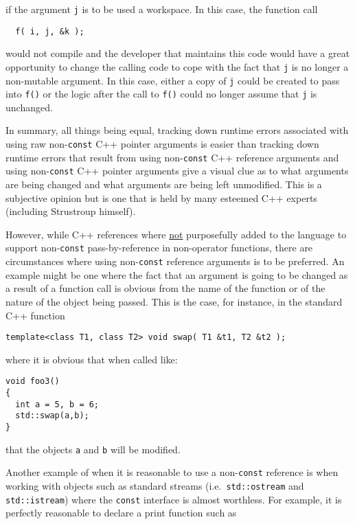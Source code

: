 {}\noindent{}if the argument {}\texttt{j} is to be used a workspace.
In this case, the function call

{\scriptsize\begin{verbatim}
  f( i, j, &k );
\end{verbatim}}

{}\noindent{}would not compile and the developer that maintains this
code would have a great opportunity to change the calling code to cope
with the fact that {}\texttt{j} is no longer a non-mutable argument.
In this case, either a copy of {}\texttt{j} could be created to pass
into {}\texttt{f()} or the logic after the call to {}\texttt{f()}
could no longer assume that {}\texttt{j} is unchanged.

In summary, all things being equal, tracking down runtime errors
associated with using raw non-\texttt{const} C++ pointer arguments is
easier than tracking down runtime errors that result from using
non-\texttt{const} C++ reference arguments and using
non-\texttt{const} C++ pointer arguments give a visual clue as to what
arguments are being changed and what arguments are being left
unmodified.  This is a subjective opinion but is one that is held by
many esteemed C++ experts (including Strustroup himself).

However, while C++ references where {}\underline{not} purposefully
added to the language to support non-\texttt{const} pass-by-reference
in non-operator functions, there are circumstances where using
non-\texttt{const} reference arguments is to be preferred.  An example
might be one where the fact that an argument is going to be changed as
a result of a function call is obvious from the name of the function
or of the nature of the object being passed.  This is the case, for
instance, in the standard C++ function

{\scriptsize\begin{verbatim}
template<class T1, class T2> void swap( T1 &t1, T2 &t2 );
\end{verbatim}}

{}\noindent{}where it is obvious that when called like:

{\scriptsize\begin{verbatim}
void foo3()
{
  int a = 5, b = 6;
  std::swap(a,b);
}
\end{verbatim}}

{}\noindent{}that the objects {}\texttt{a} and {}\texttt{b} will be
modified.

Another example of when it is reasonable to use a non-\texttt{const}
reference is when working with objects such as standard streams
(i.e.~{}\texttt{std::ostream} and {}\texttt{std::istream}) where the
{}\texttt{const} interface is almost worthless.  For example, it is
perfectly reasonable to declare a print function such as

